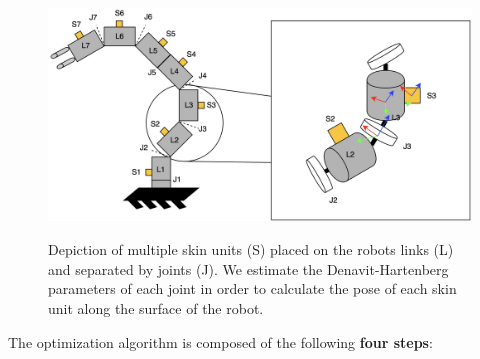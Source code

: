 \begin{figure}[H]
    \caption[Calibration theory]{
        Depiction of multiple skin units (S) placed on the robots links (L) and separated by joints (J).
        We estimate the Denavit-Hartenberg parameters of each joint in order to calculate the pose of each skin unit along the surface of the robot.
    }
    \centering
    \includegraphics[width=\textwidth]{figs/calibration_theory.png}
\label{fig:calibration_theory}
\end{figure}

The optimization algorithm is composed of the following \textbf{four steps}:

